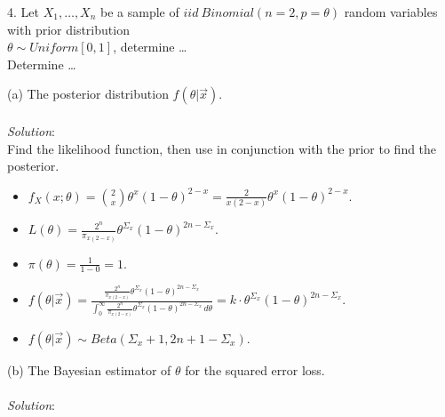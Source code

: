\documentclass[12pt]{article}
\newcommand{\XB}{\color{black}}
\newcommand{\XBB}{\color{blue}}
\newcommand{\ds}{\displaystyle}
\begin{document}
4. Let $ X_{1}, \dots , X_{n} $ be a sample of $ iid \ Binomial(n = 2, p = \theta) $ random variables
with prior distribution \\ $ \theta \sim Uniform[0, 1] $, determine \dots \\

Determine \dots \\

\XBB\hrulefill\XB 
\vspace{5mm} 

(a) The posterior distribution $ f(\theta | \overrightarrow{x}) $. \\
\vspace{2.5mm} \\
\textit{Solution}:
\vspace{2.5mm} \\

\noindent
Find the likelihood function, then use in conjunction with the prior to find the posterior. \\

\begin{itemize} 
    \item $ \ds f_X(x ; \theta) =  \binom{2}{x} \theta^{x} (1 - \theta)^{2 - x} = \frac{2}{x(2 - x)} \theta^{x} (1 - \theta)^{2 - x} $. \\
    \item $ \ds L(\theta) = \frac{2^{n}}{\pi_{x(2 - x)}} \theta^{\Sigma_{x}} (1 - \theta)^{2n - \Sigma_{x}} $. \\
    \item $ \ds \pi(\theta) = \frac{ 1 }{ 1 - 0 } = 1 $. \\
    \item $ \ds f(\theta | \overrightarrow{x}) = \frac{ \ds \frac{2^{n}}{\pi_{x(2 - x)}} \theta^{\Sigma_{x}} (1 - \theta)^{2n - \Sigma_{x}} }{ \ds \int_{0}^{\infty} \frac{2^{n}}{\pi_{x(2 - x)}} \theta^{\Sigma_{x}} (1 - \theta)^{2n - \Sigma_{x}} \, d\theta } = 
    k \cdot \theta^{\Sigma_{x}} (1 - \theta)^{2n - \Sigma_{x}} $. \\
    \item $ \ds f(\theta | \overrightarrow{x}) \sim Beta(\Sigma_{x} + 1, 2n + 1 - \Sigma_{x}) $. \\
\end{itemize} 

\vspace{2.5mm}

(b) The Bayesian estimator of $ \theta $ for the squared error loss. \\
\vspace{2.5mm} \\
\textit{Solution}:
\vspace{2.5mm} \\ 
\end{document}
